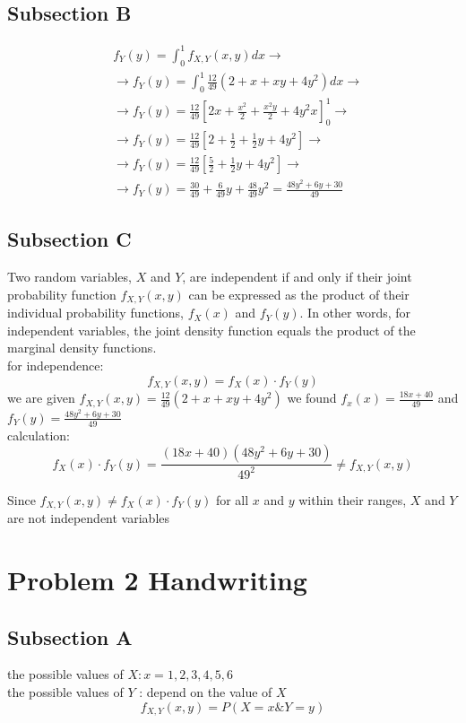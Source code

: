 \documentclass[a4paper,11pt]{article}
\theoremstyle{mytheor}
\begin{document}
\subsection{Subsection B}
$$
\begin{aligned}
& f_Y(y)=\int_0^1 f_{X, Y}(x, y) d x \rightarrow \\
& \rightarrow f_Y(y)=\int_0^1 \frac{12}{49}\left(2+x+x y+4 y^2\right) d x \rightarrow \\
& \rightarrow f_Y(y)=\frac{12}{49}\left[2 x+\frac{x^2}{2}+\frac{x^2 y}{2}+4 y^2 x\right]_0^1 \rightarrow \\
& \rightarrow f_Y(y)=\frac{12}{49}\left[2+\frac{1}{2}+\frac{1}{2} y+4 y^2\right] \rightarrow \\
& \rightarrow f_Y(y)=\frac{12}{49}\left[\frac{5}{2}+\frac{1}{2} y+4 y^2\right] \rightarrow\\
&\rightarrow f_Y(y)=\frac{30}{49}+\frac{6}{49} y+\frac{48}{49} y^2=\frac{48 y^2+6 y+30}{49}
\end{aligned}
$$

\subsection{Subsection C}
Two random variables, $X$ and $Y$, are independent if and only if their joint probability function $f_{X, Y}(x, y)$ can be expressed as the product of their individual probability functions, $f_X(x)$ and $f_Y(y)$. In other words, for independent variables, the joint density function equals the product of the marginal density functions.\\
for independence:
$$
f_{X, Y}(x, y)=f_X(x) \cdot f_Y(y)
$$
we are given $f_{X, Y}(x, y)=\frac{12}{49}\left(2+x+x y+4 y^2\right)$
we found $f_x(x)=\frac{18 x+40}{49}$ and $f_Y(y)=\frac{48 y^2+6 y+30}{49}$\\
calculation:
$$
f_X(x) \cdot f_Y(y)=\frac{(18 x+40)\left(48 y^2+6 y+30\right)}{49^2} \neq f_{X, Y}(x, y)
$$

Since $f_{X, Y}(x, y) \neq f_X(x) \cdot f_Y(y)$ for all $x$ and $y$ within their ranges, $X$ and $Y$ are not independent variables

\section{Problem 2 Handwriting}
\subsection{Subsection A}
the possible values of $X: x=1,2,3,4,5,6$\\ 
the possible values of $Y$ : depend on the value of $X$
$$
f_{X, Y}(x, y)=P(X=x \& Y=y)
$$
\end{document}
